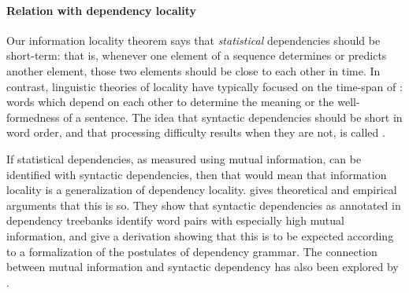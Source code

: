 
\paragraph{Relation with dependency locality}
Our information locality theorem says that \emph{statistical} dependencies should be short-term: that is, whenever one element of a sequence determines or predicts another element, those two elements should be close to each other in time. In contrast, linguistic theories of locality have typically focused on the time-span of : words which depend on each other to determine the meaning or the well-formedness of a sentence. The idea that syntactic dependencies should be short in word order, and that processing difficulty results when they are not, is called . 

If statistical dependencies, as measured using mutual information, can be identified with syntactic dependencies, then that would mean that information locality is a generalization of dependency locality. \citet{futrell2019syntactic} gives theoretical and empirical arguments that this is so. They show that syntactic dependencies as annotated in dependency treebanks identify word pairs with especially high mutual information, and give a derivation showing that this is to be expected according to a formalization of the postulates of dependency grammar. The connection between mutual information and syntactic dependency has also been explored by \citet{}. 

